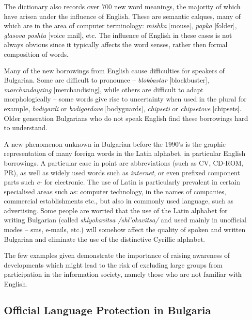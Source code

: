 \documentclass[]{../../metanetpaper}
\begin{document}
\begin{multicols}{2}
The dictionary also records over 700 new word meanings, the majority of which have arisen under the influence of English. These are semantic calques, many of which are in the area of computer terminology: \textit{{mishka}} [mouse], \textit{{papka}} [folder], \textit{{glasova poshta}} [voice mail], etc. The influence of English in these cases is not always obvious since it typically affects the word senses, rather then formal composition of words. 

Many of the new borrowings from English cause difficulties for speakers of Bulgarian. Some are difficult to pronounce – \textit{{blokbastar}} [blockbuster], \textit{{marchandayzing}} [merchandising], while others are difficult to adapt morphologically -- some words give rise to uncertainty when used in the plural for example, \textit{{bodigardi}} or \textit{{bodigardove}} [bodyguards], \textit{{chipseti}} or \textit{{chipsetove}} [chipsets]. Older generation Bulgarians who do not speak English find these borrowings hard to understand. 

A new phenomenon unknown in Bulgarian before the 1990’s is the graphic representation of many foreign words in the Latin alphabet, in particular English borrowings. A particular case in point are abbreviations (such as CV, CD-ROM, PR), as well as widely used words such as \textit{internet}, or even prefixed component parts such \textit{e-} for electronic. The use of Latin is particularly prevalent in certain specialised areas such as: computer technology, in the names of companies, commercial establishments etc., but also in commonly used language, such as advertising. Some people are worried that the use of the Latin alphabet for writing Bulgarian (called \textit{{shlyokavitsa} /shl’okavitsa/} and used mainly in unofficial modes -- sms, e-mails, etc.) \cite{shlyokavica} will somehow affect the quality of spoken and written Bulgarian and eliminate the use of the distinctive Cyrillic alphabet.

The few examples given demonstrate the importance of raising awareness of developments which might lead to the risk of excluding large groups from participation in the information society, namely those who are not familiar with English.

\subsection{Official Language Protection in Bulgaria}


\end{multicols}
\end{document}
